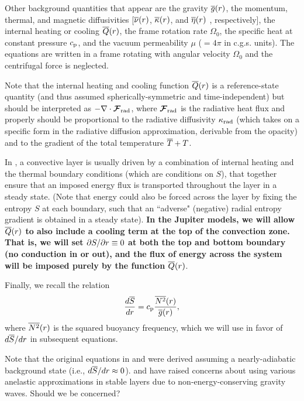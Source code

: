 \documentclass[12pt]{article}
\numberwithin{equation}{section}
\begin{document}
	Other background quantities that appear are the gravity $\overline{g}(r)$, the momentum, thermal, and magnetic diffusivities [$\overline{\nu}(r)$, $\overline{\kappa}(r)$, and $\overline{\eta}(r)$ , respectively], the internal heating or cooling $\overline{Q}(r)$, the frame rotation rate $\Omega_0$, the specific heat at constant pressure $c_{\rm{p}}$, and the vacuum permeability $\mu$ ($=4\pi$ in c.g.s. units). The equations are written in a frame rotating with angular velocity $\Omega_0$ and the centrifugal force is neglected. 
	
	Note that the internal heating and cooling function $\overline{Q}(r)$ is a reference-state quantity (and thus assumed spherically-symmetric and time-independent) but should be interpreted as $-\nabla\cdot{\bm{\mathcal{F}}}_{\rm{rad}}$, where ${\bm{\mathcal{F}}}_{\rm{rad}}$ is the radiative heat flux and properly should be proportional to the radiative diffusivity $\kappa_{\rm rad}$ (which takes on a specific form in the radiative diffusion approximation, derivable from the opacity) and to the gradient of the total temperature $\overline{T} + T$. 
	
	In {\rayleigh}, a convective layer is usually driven by a combination of internal heating and the thermal boundary conditions (which are conditions on $S$), that together ensure that an imposed energy flux is transported throughout the layer in a steady state. (Note that energy could also be forced across the layer by fixing the entropy $S$ at each boundary, such that an ``adverse" (negative) radial entropy gradient is obtained in a steady state).   \textbf{In the Jupiter models, we will allow $\overline{Q}(r)$ to also include a cooling term at the top of the convection zone. That is, we will set $\partial S/\partial r\equiv0$ at both the top and bottom boundary (no conduction in or out), and the flux of energy across the system will be imposed purely by the function $\overline{Q}(r)$}. 
	
	
	Finally, we recall the relation
	\begin{align}
		\frac{d\overline{S}}{dr} = c_{\rm{p}} \frac{\overline{N^2}(r)}{\overline{g}(r)},
	\end{align}
	where $\overline{N^2}(r)$ is the squared buoyancy frequency, which we will use in favor of $d\overline{S}/dr$ in subsequent equations. 
	
	Note that the original equations in \citet{Gilman1981} and \citet{Clune1999} were derived assuming a nearly-adiabatic background state (i.e., $d\overline{S}/dr\approx0$). \citet{Brown2012} and \citet{Vasil2013} have raised concerns about using various anelastic approximations in stable layers due to non-energy-conserving gravity waves. Should we be concerned?
	
\end{document}

